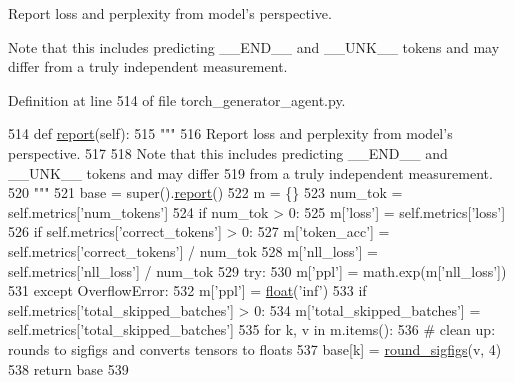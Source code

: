 \begin{DoxyVerb}Report loss and perplexity from model's perspective.

Note that this includes predicting __END__ and __UNK__ tokens and may differ
from a truly independent measurement.
\end{DoxyVerb}
 

Definition at line 514 of file torch\+\_\+generator\+\_\+agent.\+py.


\begin{DoxyCode}
514     \textcolor{keyword}{def }\hyperlink{namespaceprojects_1_1convai2_1_1eval__f1_a01a47b9c08dad189837a51f085defc45}{report}(self):
515         \textcolor{stringliteral}{"""}
516 \textcolor{stringliteral}{        Report loss and perplexity from model's perspective.}
517 \textcolor{stringliteral}{}
518 \textcolor{stringliteral}{        Note that this includes predicting \_\_END\_\_ and \_\_UNK\_\_ tokens and may differ}
519 \textcolor{stringliteral}{        from a truly independent measurement.}
520 \textcolor{stringliteral}{        """}
521         base = super().\hyperlink{namespaceprojects_1_1convai2_1_1eval__f1_a01a47b9c08dad189837a51f085defc45}{report}()
522         m = \{\}
523         num\_tok = self.metrics[\textcolor{stringliteral}{'num\_tokens'}]
524         \textcolor{keywordflow}{if} num\_tok > 0:
525             m[\textcolor{stringliteral}{'loss'}] = self.metrics[\textcolor{stringliteral}{'loss'}]
526             \textcolor{keywordflow}{if} self.metrics[\textcolor{stringliteral}{'correct\_tokens'}] > 0:
527                 m[\textcolor{stringliteral}{'token\_acc'}] = self.metrics[\textcolor{stringliteral}{'correct\_tokens'}] / num\_tok
528             m[\textcolor{stringliteral}{'nll\_loss'}] = self.metrics[\textcolor{stringliteral}{'nll\_loss'}] / num\_tok
529             \textcolor{keywordflow}{try}:
530                 m[\textcolor{stringliteral}{'ppl'}] = math.exp(m[\textcolor{stringliteral}{'nll\_loss'}])
531             \textcolor{keywordflow}{except} OverflowError:
532                 m[\textcolor{stringliteral}{'ppl'}] = \hyperlink{namespaceprojects_1_1controllable__dialogue_1_1make__control__dataset_aa2b7207688c641dbc094ab44eca27113}{float}(\textcolor{stringliteral}{'inf'})
533         \textcolor{keywordflow}{if} self.metrics[\textcolor{stringliteral}{'total\_skipped\_batches'}] > 0:
534             m[\textcolor{stringliteral}{'total\_skipped\_batches'}] = self.metrics[\textcolor{stringliteral}{'total\_skipped\_batches'}]
535         \textcolor{keywordflow}{for} k, v \textcolor{keywordflow}{in} m.items():
536             \textcolor{comment}{# clean up: rounds to sigfigs and converts tensors to floats}
537             base[k] = \hyperlink{namespaceparlai_1_1agents_1_1legacy__agents_1_1seq2seq_1_1utils__v0_af377ec61bfc0423461e7b409ffc883b9}{round\_sigfigs}(v, 4)
538         \textcolor{keywordflow}{return} base
539 
\end{DoxyCode}

